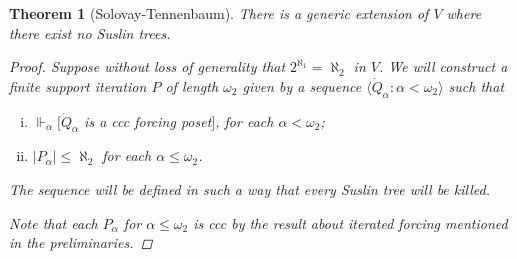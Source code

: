 \documentclass[11pt,a4paper]{report}
\newtheorem{theorem}{Theorem}[chapter] %
\theoremstyle{definition}
\theoremstyle{num.custom-title}
\theoremstyle{custom-title}
\newcommand{\forces}{\Vdash}
\begin{document}
\begin{theorem}[Solovay-Tennenbaum]
There is a generic extension of $V$ where there exist no Suslin trees.
\begin{proof}
Suppose without loss of generality that $2^{\aleph_1} = \aleph_2$ in $V$. We will construct a finite support iteration $P$ of length $\omega_2$ given by a sequence $\langle \dot{Q}_\alpha : \alpha < \omega_2 \rangle$ such that
\begin{enumerate}[(i)]
\item $\forces_\alpha [\dot{Q}_\alpha$ is a ccc forcing poset$]$, for each $\alpha < \omega_2$;
\item $|P_\alpha| \leq \aleph_2$ for each $\alpha \leq \omega_2$.
\end{enumerate}
The sequence will be defined in such a way that every Suslin tree will be killed.

Note that each $P_\alpha$ for $\alpha \leq \omega_2$ is ccc by the result about iterated forcing mentioned in the preliminaries.


\end{proof}
\end{theorem}
\end{document}
